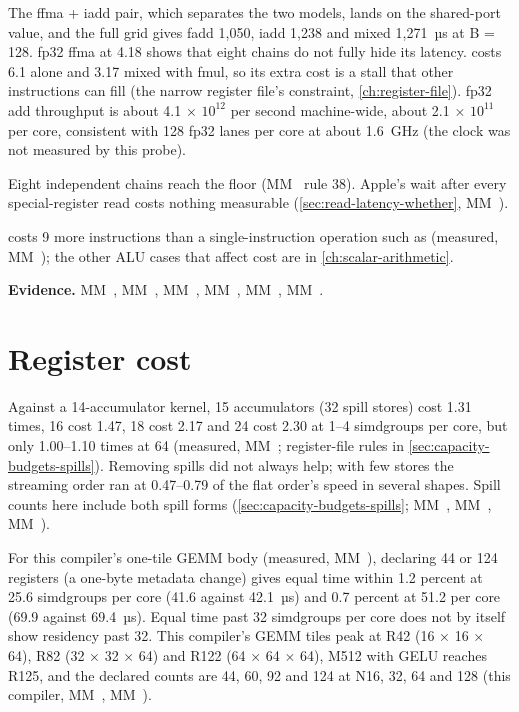 The ffma + iadd pair, which separates the two models, lands on the shared-port value, and the
full grid gives fadd 1,050, iadd 1,238 and mixed 1,271~µs at B = 128. fp32 ffma at 4.18 shows that eight
chains do not fully hide its latency.  costs 6.1 alone and 3.17 mixed with fmul, so its extra cost is a
stall that other instructions can fill (the narrow register file's constraint, \cref{ch:register-file}). fp32 add
throughput is about 4.1 × $10^{12}$ per second machine-wide, about 2.1 × $10^{11}$ per core, consistent with 128 fp32
lanes per core at about 1.6~GHz (the clock was not measured by this probe).

Eight independent chains reach the floor (MM~ rule 38). Apple's wait after every
special-register read costs nothing measurable (\cref{sec:read-latency-whether}, MM~).

 costs 9 more instructions than a single-instruction operation such as  (measured, MM~); the
other ALU cases that affect cost are in \cref{ch:scalar-arithmetic}.

\textbf{Evidence.} MM~, MM~, MM~, MM~, MM~, MM~.

\section{Register cost}\label{sec:registers-spills-occupancy}

Against a 14-accumulator kernel, 15 accumulators (32 spill stores) cost 1.31 times, 16 cost 1.47, 18 cost 2.17 and
24 cost 2.30 at 1–4 simdgroups per core, but only 1.00–1.10 times at 64 (measured, MM~; register-file rules in
\cref{sec:capacity-budgets-spills}). Removing spills did not always help; with few stores the streaming order ran
at 0.47–0.79 of the flat order's speed in several shapes.
Spill counts here include both spill forms (\cref{sec:capacity-budgets-spills}; MM~, MM~, MM~).

For this compiler's one-tile GEMM body (measured, MM~), declaring 44 or 124 registers (a one-byte metadata
change) gives equal time within 1.2 percent at 25.6 simdgroups per core (41.6 against
42.1~µs) and 0.7 percent at 51.2 per core (69.9 against 69.4~µs). Equal time past 32 simdgroups per core does not by
itself show residency past 32. This compiler's GEMM tiles peak at R42 (16 × 16 × 64), R82 (32 × 32 × 64) and R122
(64 × 64 × 64), M512 with GELU reaches R125, and the declared counts are 44, 60, 92 and 124 at N16, 32, 64 and 128
(this compiler, MM~, MM~).

